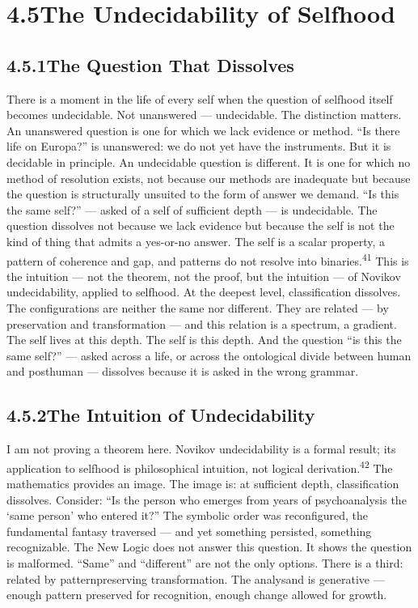 \section{4.5\quad The Undecidability of Selfhood}

\subsection{4.5.1\quad The Question That Dissolves}

There is a moment in the life of every self when the question of selfhood itself becomes undecidable. Not unanswered — undecidable. The distinction matters. An unanswered question is one for which we lack evidence or method. “Is there life on Europa?” is unanswered: we do not yet have the instruments. But it is decidable in principle. An undecidable question is different. It is one for which no method of resolution exists, not because our methods are inadequate but because the question is structurally unsuited to the form of answer we demand. “Is this the same self?” — asked of a self of sufficient depth — is undecidable. The question dissolves not because we lack evidence but because the self is not the kind of thing that admits a yes-or-no answer. The self is a scalar property, a pattern of coherence and gap, and patterns do not resolve into binaries.\textsuperscript{41} This is the intuition — not the theorem, not the proof, but the intuition — of Novikov undecidability, applied to selfhood. At the deepest level, classification dissolves. The configurations are neither the same nor different. They are related — by preservation and transformation — and this relation is a spectrum, a gradient. The self lives at this depth. The self is this depth. And the question “is this the same self?” — asked across a life, or across the ontological divide between human and posthuman — dissolves because it is asked in the wrong grammar.

\subsection{4.5.2\quad The Intuition of Undecidability}

I am not proving a theorem here. Novikov undecidability is a formal result; its application to selfhood is philosophical intuition, not logical derivation.\textsuperscript{42} The mathematics provides an image. The image is: at sufficient depth, classification dissolves. Consider: “Is the person who emerges from years of psychoanalysis the ‘same person’ who entered it?” The symbolic order was reconfigured, the fundamental fantasy traversed — and yet something persisted, something recognizable. The New Logic does not answer this question. It shows the question is malformed. “Same” and “different” are not the only options. There is a third: related by patternpreserving transformation. The analysand is generative — enough pattern preserved for recognition, enough change allowed for growth.

